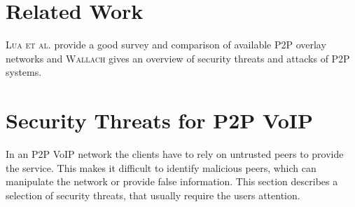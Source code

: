 \documentclass[a4paper,10pt]{article}
\begin{document}
\section{Related Work}
\label{relatedwork}

\textsc{Lua et al.} \cite{lua} provide a good survey and comparison of available
P2P overlay networks and \textsc{Wallach} \cite{wallach} gives an overview of
security threats
and attacks of P2P systems.

\section{Security Threats for P2P VoIP}
\label{p2p}
In an P2P VoIP network the clients have to rely on untrusted peers to provide
the service. This makes it difficult to identify malicious peers, which can
manipulate
the network or provide false information. This section describes a selection of
security threats, that usually require the users attention.
\end{document}
